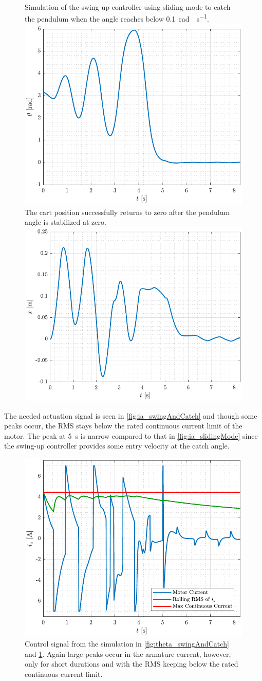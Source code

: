 \begin{figure}[H]
  \hspace{-10pt}
  \captionbox
  {
    Simulation of the swing-up controller using sliding mode to catch the pendulum when the angle reaches below \SI{0.1}{rad \cdot s^{-1}}.
    \label{fig:theta_swingAndCatch}
  }
  {
    \hspace{-1cm}
    \includegraphics[width=.4\textwidth]{figures/theta_swingAndCatch}
  }
  \hspace{20pt}
  \captionbox 
  {
    The cart position successfully returns to zero after the pendulum angle is stabilized at zero.
    \label{fig:x_swingAndCatch}
  }
  {
    \hspace{-1cm}
    \includegraphics[width=.4\textwidth]{figures/x_swingAndCatch}
  }  
\end{figure}
%
The needed actuation signal is seen in \autoref{fig:ia_swingAndCatch} and though some peaks occur, the RMS stays below the rated continuous current limit of the motor. The peak at \SI{5}{s} is narrow compared to that in \autoref{fig:ia_slidingMode} since the swing-up controller provides some entry velocity at the catch angle.
%
\begin{figure}[H]
  \includegraphics[width=.42\textwidth]{figures/ia_swingAndCatch}
  \caption{Control signal from the simulation in \autoref{fig:theta_swingAndCatch} and \ref{fig:x_swingAndCatch}. Again large peaks occur in the armature current, however, only for short durations and with the RMS keeping below the rated continuous current limit.}
  \label{fig:ia_swingAndCatch}
\end{figure}
